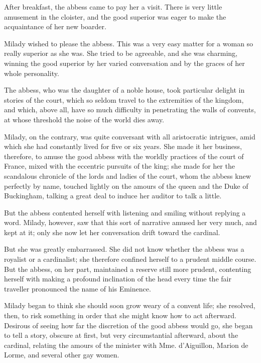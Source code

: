 After breakfast, the abbess came to pay her a visit. There is very little amusement in the cloister, and the good superior was eager to make the acquaintance of her new boarder. 

Milady wished to please the abbess. This was a very easy matter for a woman so really superior as she was. She tried to be agreeable, and she was charming, winning the good superior by her varied conversation and by the graces of her whole personality. 

The abbess, who was the daughter of a noble house, took particular delight in stories of the court, which so seldom travel to the extremities of the kingdom, and which, above all, have so much difficulty in penetrating the walls of convents, at whose threshold the noise of the world dies away. 

Milady, on the contrary, was quite conversant with all aristocratic intrigues, amid which she had constantly lived for five or six years. She made it her business, therefore, to amuse the good abbess with the worldly practices of the court of France, mixed with the eccentric pursuits of the king; she made for her the scandalous chronicle of the lords and ladies of the court, whom the abbess knew perfectly by name, touched lightly on the amours of the queen and the Duke of Buckingham, talking a great deal to induce her auditor to talk a little. 

But the abbess contented herself with listening and smiling without replying a word. Milady, however, saw that this sort of narrative amused her very much, and kept at it; only she now let her conversation drift toward the cardinal. 

But she was greatly embarrassed. She did not know whether the abbess was a royalist or a cardinalist; she therefore confined herself to a prudent middle course. But the abbess, on her part, maintained a reserve still more prudent, contenting herself with making a profound inclination of the head every time the fair traveller pronounced the name of his Eminence. 

Milady began to think she should soon grow weary of a convent life; she resolved, then, to risk something in order that she might know how to act afterward. Desirous of seeing how far the discretion of the good abbess would go, she began to tell a story, obscure at first, but very circumstantial afterward, about the cardinal, relating the amours of the minister with Mme. d'Aiguillon, Marion de Lorme, and several other gay women. 

